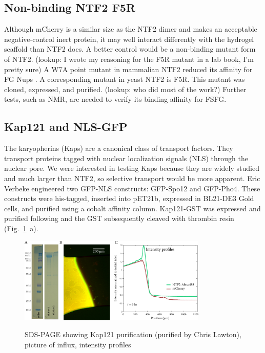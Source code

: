 \subsection{Non-binding NTF2 F5R}

Although mCherry is a similar size as the NTF2 dimer and makes an acceptable negative-control inert protein, it may well interact differently with the hydrogel scaffold than NTF2 does.  A better control would be a non-binding mutant form of NTF2.  (lookup: I wrote my reasoning for the F5R mutant in a lab book, I'm pretty sure) A W7A point mutant in mammalian NTF2 reduced its affinity for FG Nups \cite{bayliss99}.  A corresponding mutant in yeast NTF2 is F5R.  This mutant was cloned, expressed, and purified. (lookup: who did most of the work?)  Further tests, such as NMR, are needed to verify its binding affinity for FSFG.

\subsection{Kap121 and NLS-GFP}
The karyopherins (Kaps) are a canonical class of transport factors.  They transport proteins tagged with nuclear localization signals (NLS) through the nuclear pore.  We were interested in testing Kaps because they are widely studied and much larger than NTF2, so selective transport would be more apparent.  Eric Verbeke engineered two GFP-NLS constructs: GFP-Spo12 and GFP-Pho4.  These constructs were his-tagged, inserted into pET21b, expressed in BL21-DE3 Gold cells, and purified using a cobalt affinity column. 
Kap121-GST was expressed and purified following \cite{tetenbaum-novatt12} and the GST subsequently cleaved with thrombin resin (Fig.~\ref{fig:Kap121}~a).
\begin{figure} %
\caption{SDS-PAGE showing Kap121 purification (purified by Chris Lawton), picture of influx, intensity profiles}
\centering
\includegraphics[width=0.8\textwidth]{figs/ch03/Kap121}
\label{fig:Kap121}
\end{figure} %

